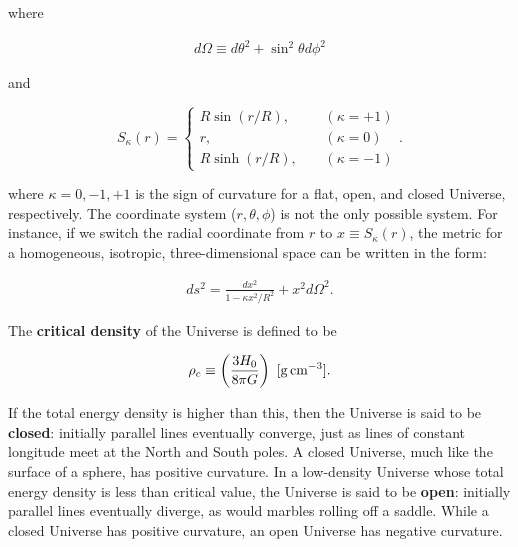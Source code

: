 \documentclass[a4paper,11pt]{article}
\begin{document}
{\noindent}where

\begin{align*}
    d\Omega \equiv d\theta^2 + \sin^2\theta d\phi^2
\end{align*}

{\noindent}and

\begin{equation*}
    S_\kappa(r) =
    \left\{
    \begin{aligned}
    R\sin(r/R), ~~~~~& (\kappa = +1) \\
              r,~~~~~& (\kappa = 0) \\
    R\sinh(r/R),~~~~~& (\kappa = -1)
    \end{aligned}
    \right.
    .
\end{equation*}

{\noindent}where $\kappa=0,-1,+1$ is the sign of curvature for a flat, open, and closed Universe, respectively. The coordinate system ($r,\theta,\phi$) is not the only possible system. For instance, if we switch the radial coordinate from $r$ to $x \equiv S_\kappa(r)$, the metric for a homogeneous, isotropic, three-dimensional space can be written in the form:

\begin{align*}
    ds^2 = \frac{dx^2}{1-\kappa x^2/R^2} + x^2d\Omega^2.
\end{align*}

The \textbf{critical density} of the Universe is defined to be

\begin{align*}
    \rho_c \equiv \left( \frac{3H_0}{8\pi G} \right) ~ [{\rm g\,cm^{-3}}].
\end{align*}

{\noindent}If the total energy density is higher than this, then the Universe is said to be \textbf{closed}: initially parallel lines eventually converge, just as lines of constant longitude meet at the North and South poles. A closed Universe, much like the surface of a sphere, has positive curvature. In a low-density Universe whose total energy density is less than critical value, the Universe is said to be \textbf{open}: initially parallel lines eventually diverge, as would marbles rolling off a saddle. While a closed Universe has positive curvature, an open Universe has negative curvature.

%
%
\end{document}
